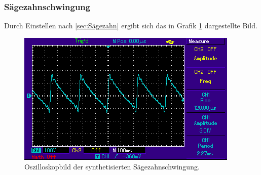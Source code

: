 \subsubsection{Sägezahnschwingung}
Durch Einstellen nach \ref{sec:Sägezahn} ergibt sich das in Grafik \ref{abb:3} dargestellte
Bild.
\begin{figure}
  \centering
  \includegraphics[scale=0.4]{Saegezahn.png}
  \caption{Oszilloskopbild der synthetisierten Sägezahnschwingung.}
  \label{abb:3}
\end{figure}

